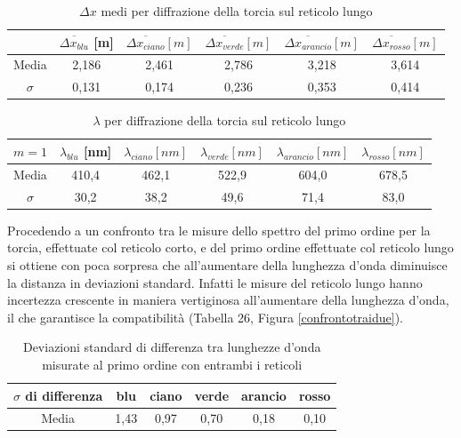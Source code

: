 \documentclass{article}
\begin{document}
\begin{table}[h]
    \centering
\begin{tabular}{||c|c|c|c|c|c||}
    \hline
     & \cellcolor{blue}$\overline{\Delta x_{blu}}$ [m] & \cellcolor{cyan}$\overline{\Delta x_{ciano}} [m]$ & \cellcolor{green}$\overline{\Delta x_{verde}}[m]$ & \cellcolor{orange}$\overline{\Delta x_{arancio}}[m]$ & \cellcolor{red}$\overline{\Delta x_{rosso}}[m]$ \\
    \hline
    Media & 2,186 & 2,461 & 2,786 & 3,218 & 3,614 \\
    $\sigma$ & 0,131 & 0,174 & 0,236 & 0,353 & 0,414 \\
    \hline
\end{tabular}
\caption{$\Delta x$ medi per diffrazione della torcia sul reticolo lungo}
\end{table}

\begin{table}[h]
    \centering
\begin{tabular}{||c|c|c|c|c|c||}
    \hline
     $m = 1$ & \cellcolor{blue}$\lambda_{blu}$ [nm] & \cellcolor{cyan}$\lambda_{ciano} [nm]$ & \cellcolor{green}$\lambda_{verde}[nm]$ & \cellcolor{orange}$\lambda_{arancio}[nm]$ & \cellcolor{red}$\lambda_{rosso}[nm]$ \\
    \hline
    Media & 410,4 & 462,1 & 522,9 & 604,0 & 678,5 \\
    $\sigma$ & 30,2 & 38,2 & 49,6 & 71,4 & 83,0\\
    \hline
\end{tabular}
\caption{$\lambda$ per diffrazione della torcia sul reticolo lungo}
\end{table}

\clearpage
Procedendo a un confronto tra le misure dello spettro del primo ordine per la torcia, effettuate col reticolo corto, e del primo ordine effettuate col reticolo lungo si ottiene con poca sorpresa che all'aumentare della lunghezza d'onda diminuisce la distanza in deviazioni standard. Infatti le misure del reticolo lungo hanno incertezza crescente in maniera vertiginosa all'aumentare della lunghezza d'onda, il che garantisce la compatibilità (Tabella 26, Figura \ref{confrontotraidue}).

\begin{table}[h]
    \centering
\begin{tabular}{||c|c|c|c|c|c||}
    \hline
     $\sigma$ di differenza & \cellcolor{blue}blu& \cellcolor{cyan}ciano  & \cellcolor{green}verde & \cellcolor{orange}arancio & \cellcolor{red}rosso \\
    \hline
    Media & 1,43 & 0,97 & 0,70 & 0,18 & 0,10 \\
    \hline
\end{tabular}
\caption{Deviazioni standard di differenza tra lunghezze d'onda misurate al primo ordine con entrambi i reticoli}
\end{table}
\end{document}
